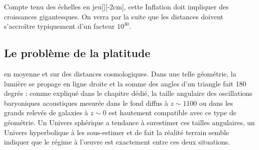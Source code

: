 Compte tenu des échelles en jeu[][-2cm], cette Inflation doit impliquer des croissances gigantesques. On verra par la suite que les distances doivent s'accroître typiquement d'un facteur $10^{30}$.


\subsection{Le problème de la platitude}
 en moyenne et sur des distances cosmologiques. Dans une telle géométrie, la lumière se propage en ligne droite et la somme des angles d'un triangle fait 180 degrés : comme expliqué dans le chapitre dédié, la taille angulaire des oscillations baryoniques acoustiques mesurée dans le fond diffus à $z\sim1100$ ou dans les grands relevés de galaxies à $z\sim 0$ est hautement compatible avec ce type de géométrie. Un Univers sphérique a tendance à surestimer ces tailles angulaires, un Univers hyperbolique à les sous-estimer et de fait la réalité terrain semble indiquer que le régime à l'œuvre est exactement entre ces deux situations.

